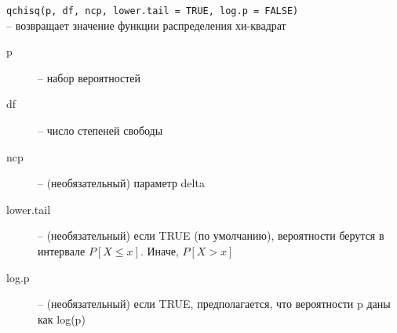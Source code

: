 \begin{enumerate}
          \begin{mdframed}[style=BadassFrame]

              \texttt{qchisq(p, df, ncp, lower.tail = TRUE, log.p = FALSE)} \\ -- возвращает значение функции распределения хи-квадрат
              \begin{description}

                \item[p] -- набор вероятностей
                \item[df] -- число степеней свободы
                \item[ncp] -- (необязательный) параметр delta
                \item[lower.tail] -- (необязательный) если TRUE (по умолчанию), вероятности берутся в интервале $P[X \leq x]$. Иначе, $P[X > x]$ 
                \item[log.p] -- (необязательный) если TRUE, предполагается, что вероятности p даны как log(p)
              \end{description}
        \end{mdframed}


\end{enumerate}



